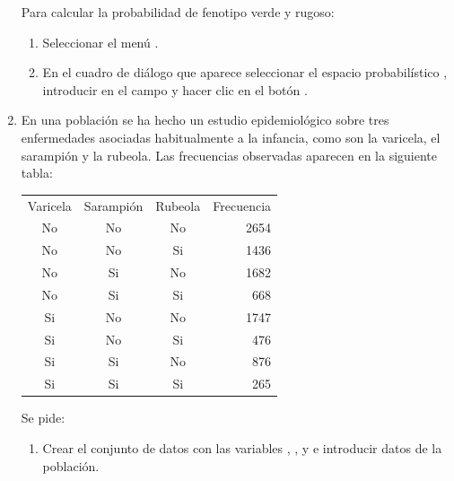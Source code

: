 \begin{enumerate}[leftmargin=*]
{\begin{enumerate}
\begin{indicacion}
\begin{enumerate}
\end{enumerate}
Para calcular la probabilidad de fenotipo verde y rugoso:
\begin{enumerate}
\item Seleccionar el menú .
\item En el cuadro de diálogo que aparece seleccionar el espacio probabilístico , introducir
 en el campo  y hacer clic en el botón .
\end{enumerate}
\end{indicacion}
\end{enumerate}
}

\item En una población se ha hecho un estudio epidemiológico sobre tres enfermedades asociadas habitualmente a la infancia, como son la
varicela, el sarampión y la rubeola.
Las frecuencias observadas aparecen en la siguiente tabla:
\begin{center} 
\begin{tabular}{cccr}
\hline
Varicela & Sarampión & Rubeola & Frecuencia\\
No & No & No & 2654\\
No & No & Si & 1436\\
No & Si & No & 1682\\
No & Si & Si & 668\\
Si & No & No & 1747\\
Si & No & Si & 476\\
Si & Si & No & 876\\
Si & Si & Si & 265\\
\hline
\end{tabular}
\end{center}

Se pide:
\begin{enumerate}
\item Crear el conjunto de datos  con las variables , ,
 y  e introducir datos de la población.


\end{enumerate}
\end{enumerate}
